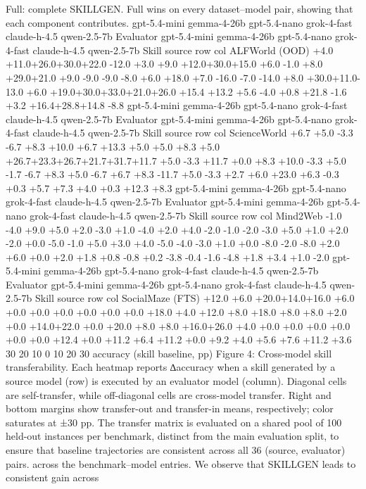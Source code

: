 Full: complete SKILLGEN. Full wins on every dataset–model pair, showing that each component
contributes.
gpt-5.4-mini
gemma-4-26b
gpt-5.4-nano
grok-4-fast
claude-h-4.5
qwen-2.5-7b
Evaluator
gpt-5.4-mini
gemma-4-26b
gpt-5.4-nano
grok-4-fast
claude-h-4.5
qwen-2.5-7b
Skill source
row 
col 
ALFWorld (OOD)
+4.0 +11.0+26.0+30.0+22.0 -12.0
+3.0 +9.0 +12.0+30.0+15.0 +6.0
-1.0 +8.0 +29.0+21.0 +9.0 -9.0
-9.0
-8.0 +6.0 +18.0 +7.0 -16.0
-7.0 -14.0 +8.0 +30.0+11.0-13.0
+6.0 +19.0+30.0+33.0+21.0+26.0
+15.4
+13.2
+5.6
-4.0
+0.8
+21.8
-1.6 +3.2 +16.4+28.8+14.8 -8.8
gpt-5.4-mini
gemma-4-26b
gpt-5.4-nano
grok-4-fast
claude-h-4.5
qwen-2.5-7b
Evaluator
gpt-5.4-mini
gemma-4-26b
gpt-5.4-nano
grok-4-fast
claude-h-4.5
qwen-2.5-7b
Skill source
row 
col 
ScienceWorld
+6.7 +5.0 -3.3
-6.7 +8.3 +10.0
+6.7 +13.3 +5.0 +5.0 +8.3 +5.0
+26.7+23.3+26.7+21.7+31.7+11.7
+5.0 -3.3 +11.7 +0.0 +8.3 +10.0
-3.3 +5.0 -1.7
-6.7 +8.3 +5.0
-6.7 +6.7 +8.3 -11.7 +5.0 -3.3
+2.7
+6.0
+23.0
+6.3
-0.3
+0.3
+5.7 +7.3 +4.0 +0.3 +12.3 +8.3
gpt-5.4-mini
gemma-4-26b
gpt-5.4-nano
grok-4-fast
claude-h-4.5
qwen-2.5-7b
Evaluator
gpt-5.4-mini
gemma-4-26b
gpt-5.4-nano
grok-4-fast
claude-h-4.5
qwen-2.5-7b
Skill source
row 
col 
Mind2Web
-1.0 -4.0 +9.0 +5.0 +2.0 -3.0
+1.0 -4.0 +2.0 +4.0 -2.0
-1.0
-2.0
-3.0 +5.0 +1.0 +2.0 -2.0
+0.0 -5.0
-1.0 +5.0 +3.0 +4.0
-5.0
-4.0
-3.0 +1.0 +0.0 -8.0
-2.0
-8.0 +2.0 +6.0 +0.0 +2.0
+1.8
+0.8
-0.8
+0.2
-3.8
-0.4
-1.6
-4.8 +1.8 +3.4 +1.0 -2.0
gpt-5.4-mini
gemma-4-26b
gpt-5.4-nano
grok-4-fast
claude-h-4.5
qwen-2.5-7b
Evaluator
gpt-5.4-mini
gemma-4-26b
gpt-5.4-nano
grok-4-fast
claude-h-4.5
qwen-2.5-7b
Skill source
row 
col 
SocialMaze (FTS)
+12.0 +6.0 +20.0+14.0+16.0 +6.0
+0.0 +0.0 +0.0 +0.0 +0.0 +0.0
+18.0 +4.0 +12.0 +8.0 +18.0 +8.0
+8.0 +2.0 +0.0 +14.0+22.0 +0.0
+20.0 +8.0 +8.0 +16.0+26.0 +4.0
+0.0 +0.0 +0.0 +0.0 +0.0 +0.0
+12.4
+0.0
+11.2
+6.4
+11.2
+0.0
+9.2 +4.0 +5.6 +7.6 +11.2 +3.6
30
20
10
0
10
20
30
 accuracy (skill  baseline, pp)
Figure 4: Cross-model skill transferability. Each heatmap reports ∆accuracy when a skill generated
by a source model (row) is executed by an evaluator model (column). Diagonal cells are self-transfer,
while off-diagonal cells are cross-model transfer. Right and bottom margins show transfer-out and
transfer-in means, respectively; color saturates at ±30 pp. The transfer matrix is evaluated on a shared
pool of 100 held-out instances per benchmark, distinct from the main evaluation split, to ensure that
baseline trajectories are consistent across all 36 (source, evaluator) pairs.
across the benchmark–model entries. We observe that SKILLGEN leads to consistent gain across
